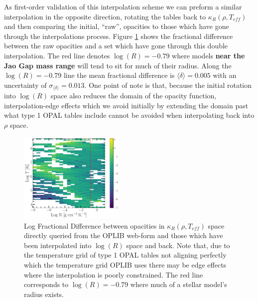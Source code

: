 As first-order validation of this interpolation scheme we can preform a similar
interpolation in the opposite direction, rotating the tables back to
$\kappa_{R}(\rho, T_{eff})$ and then comparing the initial, ``raw'', opacities
to those which have gone through the interpolations process. Figure
\ref{fig:fracdiff} shows the fractional difference between the raw opacities
and a set which have gone through this double interpolation. The red line
denotes $\log(R)=-0.79$ where models \textbf{near the Jao Gap mass range} will
tend to sit for much of their radius. Along the $\log(R)=-0.79$ line the mean
fractional difference is $\langle \delta \rangle = 0.005$ with an uncertainty of
$\sigma_{\langle\delta\rangle} = 0.013$. One point of note is that, because the
initial rotation into $\log(R)$ space also reduces the domain of the opacity
function, interpolation-edge effects which we avoid initially by extending the
domain past what type 1 OPAL tables include cannot be avoided when
interpolating back into $\rho$ space. 

\begin{figure}
	\centering
	\includegraphics[width=0.45\textwidth]{FractionalDifference.pdf}
	\caption{Log Fractional Difference between opacities in $\kappa_{R}(\rho,
	T_{eff})$ space directly queried from the OPLIB web-form and those which
	have been interpolated into $\log(R)$ space and back. Note that, due to the
	temperature grid of type 1 OPAL tables not aligning perfectly which the temperature
	grid OPLIB uses there may be edge effects where the interpolation is poorly
	constrained. The red line corresponds to $\log(R) = -0.79$ where much of a
	stellar model's radius exists.}
	\label{fig:fracdiff}
\end{figure}

